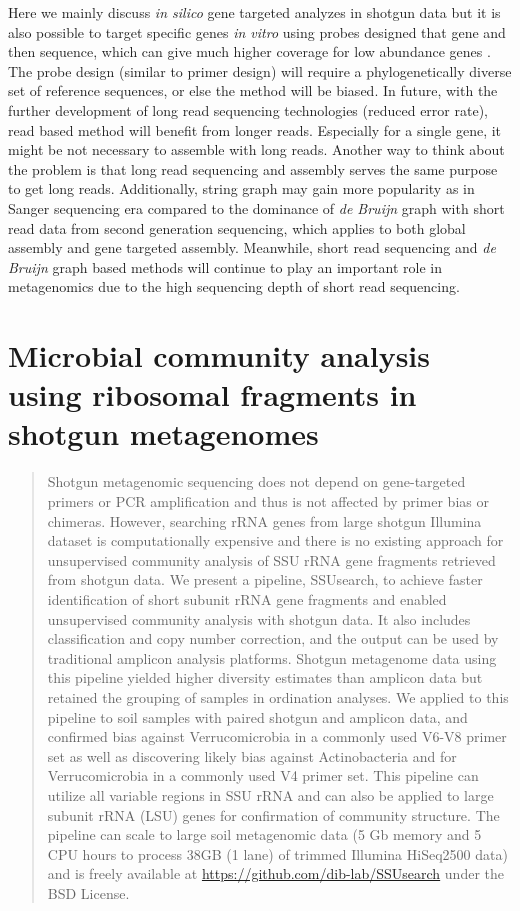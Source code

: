 \documentclass[]{msu-thesis}
\begin{document}
Here we mainly discuss \textit{in silico} gene targeted analyzes in
shotgun data but it is also possible to target specific genes
\textit{in vitro} using probes designed that gene and then sequence,
which can give much higher coverage for low abundance genes
\cite{mercer_targeted_2014}. The probe design (similar to primer
design) will require a phylogenetically diverse set of reference
sequences, or else the method will be biased. In future, with the
further development of long read sequencing technologies (reduced
error rate), read based method will benefit from longer
reads. Especially for a single gene, it might be not necessary to
assemble with long reads. Another way to think about the problem is
that long read sequencing and assembly serves the same purpose to get
long reads. Additionally, string graph may gain more popularity as in
Sanger sequencing era compared to the dominance of \textit{de Bruijn}
graph with short read data from second generation sequencing, which
applies to both global assembly and gene targeted assembly. Meanwhile,
short read sequencing and \textit{de Bruijn} graph based methods will
continue to play an important role in metagenomics due to the high sequencing
depth of short read sequencing.





\chapter{Microbial community analysis using ribosomal fragments in shotgun metagenomes}

\begin{abstract}
Shotgun metagenomic sequencing does not depend on gene-targeted primers or PCR amplification and thus is not affected by primer bias or chimeras. However, searching rRNA genes from large shotgun Illumina dataset is computationally expensive and there is no existing approach for unsupervised community analysis of SSU rRNA gene fragments retrieved from shotgun data. We present a pipeline, SSUsearch, to achieve faster identification of short subunit rRNA gene fragments and enabled unsupervised community analysis with shotgun data. It also includes classification and copy number correction, and the output can be used by traditional amplicon analysis platforms. Shotgun metagenome data using this pipeline yielded higher diversity estimates than amplicon data but retained the grouping of samples in ordination analyses. We applied to this pipeline to soil samples with paired shotgun and amplicon data, and confirmed bias against Verrucomicrobia in a commonly used V6-V8 primer set as well as discovering likely bias against Actinobacteria and for Verrucomicrobia in a commonly used V4 primer set. This pipeline can utilize all variable regions in SSU rRNA and can also be applied to large subunit rRNA (LSU) genes for confirmation of community structure. The pipeline can scale to large soil metagenomic data (5 Gb memory and 5 CPU hours to process 38GB (1 lane) of trimmed Illumina HiSeq2500 data) and is freely available at \url{https://github.com/dib-lab/SSUsearch} under the BSD License.
\end{abstract}
\end{document}
